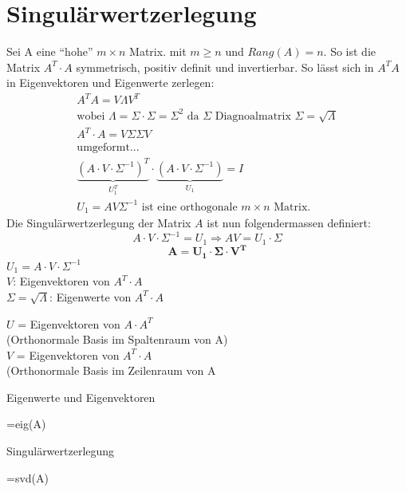 \documentclass[a4paper,twocolumn]{article}
\begin{document}
\section{Singulärwertzerlegung}
		\begin{fsatz}
			Sei A eine ``hohe'' $m \times n$ Matrix. mit $m \geqslant n$ und $Rang(A) = n$. So ist die Matrix $A^T \cdot A$  symmetrisch, positiv definit und invertierbar. So lässt sich in $A^TA$ in Eigenvektoren und Eigenwerte zerlegen: 
			\begin{align*}
				A^TA = V\Lambda V^T \\
				\text{wobei }\Lambda = \Sigma \cdot \Sigma = \Sigma^2 \text{ da }\Sigma \text{ Diagnoalmatrix } \Sigma = \sqrt{\Lambda}\\
				A^T\cdot A = V \Sigma \Sigma V \\
				\text{umgeformt...}\\
				\underbrace{(A \cdot V \cdot \Sigma^{-1})^T}_{U_1^T}  \cdot \underbrace{(A \cdot V \cdot \Sigma^{-1})}_{U_1}=I \\
				U_1 = A V \Sigma^{-1} \text{ ist eine orthogonale }m \times n\text{ Matrix.}
			\end{align*}
			Die Singulärwertzerlegung der Matrix $A$ ist nun folgendermassen definiert:
			$$A \cdot V \cdot \Sigma^{-1} = U_1\Rightarrow AV= U_1 \cdot \Sigma$$ $$\mathbf{A = U_1 \cdot \Sigma \cdot V^T}$$
			$U_1 = A \cdot V \cdot \Sigma^{-1}$\\
			$V$: Eigenvektoren von $A^T\cdot A$\\
			$\Sigma = \sqrt{\Lambda}$: Eigenwerte von $A^T \cdot A$ 
		\end{fsatz}
		
		\begin{fdef}
			$U$ = Eigenvektoren von $A\cdot A^T$\\(Orthonormale Basis im Spaltenraum von A)\\
			$V$ = Eigenvektoren von $A^T \cdot A$\\(Orthonormale Basis im Zeilenraum von A\\
		\end{fdef}
		
		\begin{fmerke}[Matlab]
			Eigenwerte und Eigenvektoren
			\begin{verbatim*}
				[U,V]=eig(A) 
			\end{verbatim*}
				Singulärwertzerlegung
			\begin{verbatim*}
				[S,V,D]=svd(A)
			\end{verbatim*}
		\end{fmerke}
\end{document}
